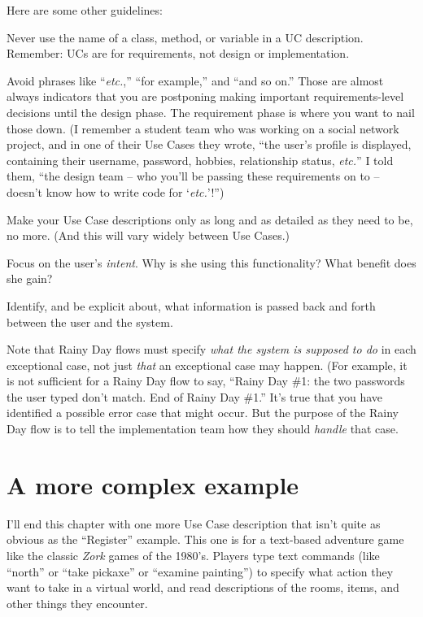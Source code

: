 Here are some other guidelines:

\begin{compactitem}
\item Never use the name of a class, method, or variable in a UC description.
Remember: UCs are for requirements, not design or implementation.

\item Avoid phrases like ``\textit{etc.},'' ``for example,'' and ``and so
on.'' Those are almost always indicators that you are postponing making
important requirements-level decisions until the design phase. The requirement
phase is where you want to nail those down. (I remember a student team who was
working on a social network project, and in one of their Use Cases they wrote,
``the user's profile is displayed, containing their username, password,
hobbies, relationship status, \textit{etc.}'' I told them, ``the design team
-- who you'll be passing these requirements on to -- doesn't know how to write
code for `\textit{etc.}'!'')
\item Make your Use Case descriptions only as long and as detailed as they
need to be, no more. (And this will vary widely between Use Cases.)
\item Focus on the user's \textit{intent}. Why is she using this
functionality? What benefit does she gain?
\item Identify, and be explicit about, what information is passed back and
forth between the user and the system.
\item Note that Rainy Day flows must specify \textit{what the system is
supposed to do} in each exceptional case, not just \textit{that} an
exceptional case may happen. (For example, it is not sufficient for a Rainy
Day flow to say, ``Rainy Day \#1: the two passwords the user typed don't
match. End of Rainy Day \#1.'' It's true that you have identified a possible
error case that might occur. But the purpose of the Rainy Day flow is to tell
the implementation team how they should \textit{handle} that case.
\end{compactitem}

\section{A more complex example}

I'll end this chapter with one more Use Case description that isn't quite as
obvious as the ``Register'' example. This one is for a text-based adventure
game like the classic \textit{Zork} games of the 1980's. Players type text
commands (like ``north'' or ``take pickaxe'' or ``examine painting'') to
specify what action they want to take in a virtual world, and read
descriptions of the rooms, items, and other things they encounter.


